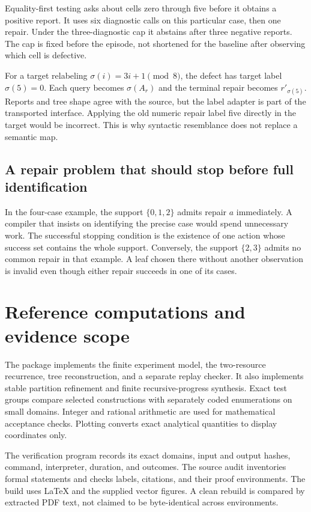 \documentclass[11pt,letterpaper]{article}
\theoremstyle{plain}
\theoremstyle{definition}
\begin{document}
Equality-first testing asks about cells zero through five before it obtains a positive report. It uses six diagnostic calls on this particular case, then one repair. Under the three-diagnostic cap it abstains after three negative reports. The cap is fixed before the episode, not shortened for the baseline after observing which cell is defective.

For a target relabeling $\sigma(i)=3i+1\pmod8$, the defect has target label $\sigma(5)=0$. Each query becomes $\sigma(A_r)$ and the terminal repair becomes $r'_{\sigma(5)}$. Reports and tree shape agree with the source, but the label adapter is part of the transported interface. Applying the old numeric repair label five directly in the target would be incorrect. This is why syntactic resemblance does not replace a semantic map.

\subsection{A repair problem that should stop before full identification}
In the four-case example, the support $\{0,1,2\}$ admits repair $a$ immediately. A compiler that insists on identifying the precise case would spend unnecessary work. The successful stopping condition is the existence of one action whose success set contains the whole support. Conversely, the support $\{2,3\}$ admits no common repair in that example. A leaf chosen there without another observation is invalid even though either repair succeeds in one of its cases.

\section{Reference computations and evidence scope}\label{app:checks}
The package implements the finite experiment model, the two-resource recurrence, tree reconstruction, and a separate replay checker. It also implements stable partition refinement and finite recursive-progress synthesis. Exact test groups compare selected constructions with separately coded enumerations on small domains. Integer and rational arithmetic are used for mathematical acceptance checks. Plotting converts exact analytical quantities to display coordinates only.

The verification program records its exact domains, input and output hashes, command, interpreter, duration, and outcomes. The source audit inventories formal statements and checks labels, citations, and their proof environments. The build uses LaTeX and the supplied vector figures. A clean rebuild is compared by extracted PDF text, not claimed to be byte-identical across environments.
\end{document}
